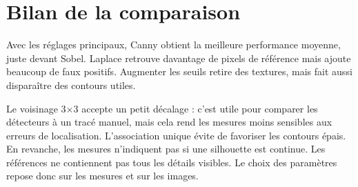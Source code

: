 \documentclass[a4paper,11pt]{article}
\begin{document}
\section{Bilan de la comparaison}
Avec les réglages principaux, Canny obtient la meilleure performance moyenne,
juste devant Sobel. Laplace retrouve davantage de pixels de référence mais
ajoute beaucoup de faux positifs. Augmenter les seuils retire des textures,
mais fait aussi disparaître des contours utiles.

Le voisinage 3$\times$3 accepte un petit décalage : c'est utile pour comparer
les détecteurs à un tracé manuel, mais cela rend les mesures moins sensibles
aux erreurs de localisation. L'association unique évite de favoriser les
contours épais. En revanche, les mesures n'indiquent pas si une silhouette
est continue. Les références ne contiennent pas tous les détails visibles.
Le choix des paramètres repose donc sur les mesures et sur les images.
\end{document}
